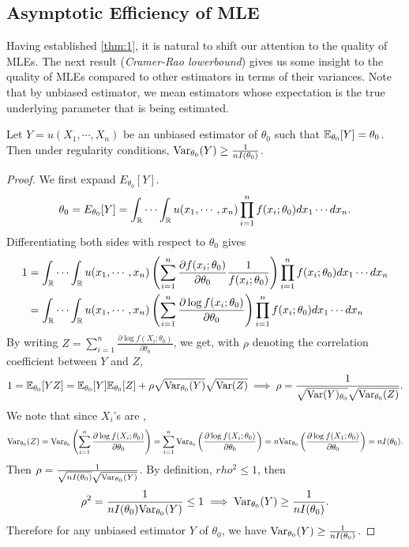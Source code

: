 \subsection{Asymptotic Efficiency of MLE}
Having established \cref{thm:1}, it is natural to shift our attention to the quality of MLEs. The next result (\emph{Cramer-Rao lowerbound}) gives us some insight to the quality of MLEs compared to other estimators in terms of their variances. Note that by unbiased estimator, we mean estimators whose expectation is the true underlying parameter that is being estimated.
\begin{theorem}\label{thm:2}
Let $Y = u(X_1,\cdots,X_n)$ be an unbiased estimator of $\theta_0$ such that $\mathbb{E}_{\theta_0}[Y] = \theta_0$. Then under regularity conditions, $\text{Var}_{\theta_0}(Y) \geq \frac{1}{nI(\theta_0)}$.
\end{theorem}
\begin{proof}
We first expand $E_{\theta_0}[Y]$.
\begin{align*}
\theta_0 = E_{\theta_0}[Y] = \int_{\mathbb{R}}\cdots\int_{\mathbb{R}} u(x_1,\cdots,x_n)\prod_{i=1}^nf(x_i;\theta_0)dx_1\cdots dx_n.
\end{align*}
Differentiating both sides with respect to $\theta_0$ gives
\begin{align*}
1 &= \int_{\mathbb{R}}\cdots\int_{\mathbb{R}} u(x_1,\cdots,x_n) \left(\sum_{i=1}^n \frac{\partial f(x_i;\theta_0)}{\partial\theta_0} \frac{1}{f(x_i;\theta_0)}\right) \prod_{i=1}^nf(x_i;\theta_0)dx_1\cdots dx_n\\
&= \int_{\mathbb{R}}\cdots\int_{\mathbb{R}} u(x_1,\cdots,x_n) \left(\sum_{i=1}^n \frac{\partial \log f(x_i;\theta_0)}{\partial\theta_0} \right) \prod_{i=1}^nf(x_i;\theta_0)dx_1\cdots dx_n
\end{align*}
By writing $Z = \sum_{i=1}^n \frac{\partial \log f(X_i;\theta_0)}{\partial\theta_0}$, we get, with $\rho$ denoting the correlation coefficient between $Y$ and $Z$,
\begin{align*}
1 = \mathbb{E}_{\theta_0}[YZ] = \mathbb{E}_{\theta_0}[Y]\mathbb{E}_{\theta_0}[Z] + \rho\sqrt{\text{Var}_{\theta_0}(Y)}\sqrt{\text{Var}(Z)} \implies \rho = \frac{1}{\sqrt{\text{Var}(Y)_{\theta_0}}\sqrt{\text{Var}_{\theta_0}(Z)}}.
\end{align*}
We note that since $X_i$'s are \iid,
\begin{align*}
\text{Var}_{\theta_0}(Z) = \text{Var}_{\theta_0}\left( \sum_{i=1}^n \frac{\partial \log f(X_i;\theta_0)}{\partial\theta_0} \right)
= \sum_{i=1}^n \text{Var}_{\theta_0}\left(\frac{\partial \log f(X_i;\theta_0)}{\partial\theta_0}\right)
= n\text{Var}_{\theta_0}\left(\frac{\partial \log f(X_1;\theta_0)}{\partial\theta_0}\right)
= nI(\theta_0).
\end{align*}
Then $\rho = \frac{1}{\sqrt{nI(\theta_0)}\sqrt{\text{Var}_{\theta_0}(Y)}}$. By definition, $rho^2 \leq 1$, then
\begin{align*}
\rho^2 = \frac{1}{nI(\theta_0)\text{Var}_{\theta_0}(Y)} \leq 1 \implies \text{Var}_{\theta_0}(Y) \geq \frac{1}{nI(\theta_0)}.
\end{align*}
Therefore for any unbiased estimator $Y$ of $\theta_0$, we have $\text{Var}_{\theta_0}(Y) \geq \frac{1}{nI(\theta_0)}$.
\end{proof}

